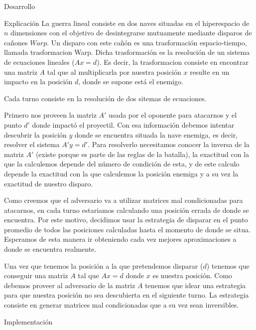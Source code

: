 \begin{section}{Desarrollo}
	\begin{subsection}{Explicación}
		La guerra lineal consiste en dos naves situadas en el hiperespacio de $n$ dimensiones con el objetivo de desintegrarse mutuamente mediante disparos de cañones $Warp$. Un disparo con este cañón es una trasformación espacio-tiempo, llamada trasformacion Warp. Dicha trasformación es la resolución de un sistema de ecuaciones lineales ($Ax=d$). Es decir, la trasformacion consiste en encontrar una matriz $A$ tal que al multiplicarla por nuestra posición $x$ resulte en un impacto en la posición $d$, donde se supone está el enemigo.
		
		Cada turno consiste en la resolución de dos sitemas de ecuaciones.
		
		Primero nos proveen la matriz $A'$ usada por el oponente para atacarnos y el punto $d'$ donde impactó el proyectil. Con esa información debemos intentar descubrir la posición $y$ donde se encuentra situada la nave enemiga, es decir, resolver el sistema $A'y=d'$. Para resolverlo necesitamos conocer la inversa de la matriz $A'$ (existe porque es parte de las reglas de la batalla), la exactitud con la que la calculemos depende del número de condición de esta, y de este calculo depende la exactitud con la que calculemos la posición enemiga y a su vez la exactitud de nuestro disparo.
		
		Como creemos que el adversario va a utilizar matrices mal condicionadas para atacarnos, en cada turno estariamos calculando una posición errada de donde se encuentra. Por este motivo, decidimos usar la estrategia de disparar en el punto promedio de todos las posiciones calculadas hasta el momento de donde se situa. Esperamos de esta manera ir obteniendo cada vez mejores aproximaciones a donde se encuentra realmente.
		
		Una vez que tenemos la posición a la que pretendemos disparar ($d$) tenemos que conseguir una matriz $A$ tal que $Ax=d$ donde $x$ es nuestra posición. Como debemos proveer al adversario de la matriz $A$ tenemos que idear una estrategia para que nuestra posición no sea descubierta en el siguiente turno. La estrategia consiste en generar matrices mal condicionadas que a su vez sean inversibles.
		
	\end{subsection}
	\begin{subsection}{Implementación}

	\end{subsection}
\end{section}
